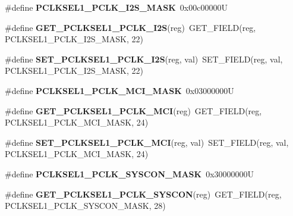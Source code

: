\begin{DoxyCompactItemize}
\mbox{\label{group__lpc24xx__regs_ga40f2a08cc2355ff53810d45d16e137d7}} 
\#define {\bfseries P\+C\+L\+K\+S\+E\+L1\+\_\+\+P\+C\+L\+K\+\_\+\+I2\+S\+\_\+\+M\+A\+SK}~0x00c00000U
\item 
\mbox{\label{group__lpc24xx__regs_ga1fb34bb06beeeb7dbb8bbadf9ccf2738}} 
\#define {\bfseries G\+E\+T\+\_\+\+P\+C\+L\+K\+S\+E\+L1\+\_\+\+P\+C\+L\+K\+\_\+\+I2S}(reg)~G\+E\+T\+\_\+\+F\+I\+E\+LD(reg, P\+C\+L\+K\+S\+E\+L1\+\_\+\+P\+C\+L\+K\+\_\+\+I2\+S\+\_\+\+M\+A\+SK, 22)
\item 
\mbox{\label{group__lpc24xx__regs_gae046a883a14ff4f140319308eaa20813}} 
\#define {\bfseries S\+E\+T\+\_\+\+P\+C\+L\+K\+S\+E\+L1\+\_\+\+P\+C\+L\+K\+\_\+\+I2S}(reg,  val)~S\+E\+T\+\_\+\+F\+I\+E\+LD(reg, val, P\+C\+L\+K\+S\+E\+L1\+\_\+\+P\+C\+L\+K\+\_\+\+I2\+S\+\_\+\+M\+A\+SK, 22)
\item 
\mbox{\label{group__lpc24xx__regs_ga0c37f79e98827c04d10f935788f1ff43}} 
\#define {\bfseries P\+C\+L\+K\+S\+E\+L1\+\_\+\+P\+C\+L\+K\+\_\+\+M\+C\+I\+\_\+\+M\+A\+SK}~0x03000000U
\item 
\mbox{\label{group__lpc24xx__regs_ga6601e7298e937430a29098f89b896d2f}} 
\#define {\bfseries G\+E\+T\+\_\+\+P\+C\+L\+K\+S\+E\+L1\+\_\+\+P\+C\+L\+K\+\_\+\+M\+CI}(reg)~G\+E\+T\+\_\+\+F\+I\+E\+LD(reg, P\+C\+L\+K\+S\+E\+L1\+\_\+\+P\+C\+L\+K\+\_\+\+M\+C\+I\+\_\+\+M\+A\+SK, 24)
\item 
\mbox{\label{group__lpc24xx__regs_ga0d971fcfa36553230b27c03ed51d4961}} 
\#define {\bfseries S\+E\+T\+\_\+\+P\+C\+L\+K\+S\+E\+L1\+\_\+\+P\+C\+L\+K\+\_\+\+M\+CI}(reg,  val)~S\+E\+T\+\_\+\+F\+I\+E\+LD(reg, val, P\+C\+L\+K\+S\+E\+L1\+\_\+\+P\+C\+L\+K\+\_\+\+M\+C\+I\+\_\+\+M\+A\+SK, 24)
\item 
\mbox{\label{group__lpc24xx__regs_ga4b9fa81d9a91dbfad3688a9c3c277483}} 
\#define {\bfseries P\+C\+L\+K\+S\+E\+L1\+\_\+\+P\+C\+L\+K\+\_\+\+S\+Y\+S\+C\+O\+N\+\_\+\+M\+A\+SK}~0x30000000U
\item 
\mbox{\label{group__lpc24xx__regs_gaa107b44d6a8a92ab5220136516f30f38}} 
\#define {\bfseries G\+E\+T\+\_\+\+P\+C\+L\+K\+S\+E\+L1\+\_\+\+P\+C\+L\+K\+\_\+\+S\+Y\+S\+C\+ON}(reg)~G\+E\+T\+\_\+\+F\+I\+E\+LD(reg, P\+C\+L\+K\+S\+E\+L1\+\_\+\+P\+C\+L\+K\+\_\+\+S\+Y\+S\+C\+O\+N\+\_\+\+M\+A\+SK, 28)

\end{DoxyCompactItemize}
